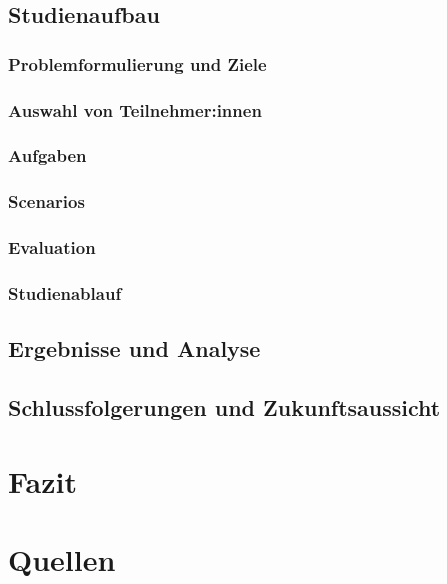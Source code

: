 \documentclass[a4paper, 12pt, oneside, BCOR=1cm,toc=chapterentrywithdots]{scrbook}
\begin{document}
\section{Studienaufbau}
\subsection{Problemformulierung und Ziele}
\subsection{Auswahl von Teilnehmer:innen}
\subsection{Aufgaben}
\subsection{Scenarios}
\subsection{Evaluation}
\subsection{Studienablauf}
\section{Ergebnisse und Analyse}
\section{Schlussfolgerungen und Zukunftsaussicht}

\chapter{Fazit}


\nocite{*}
\chapter*{Quellen}
\begingroup
\let\clearpage\relax
\printbibliography[filter=articles, title=Artikel, heading=subbibliography]
\printbibliography[type=book, title=Bücher, heading=subbibliography]
\printbibliography[type=misc, title=sonstige, heading=subbibliography]
\endgroup

\printindex
\end{document}
